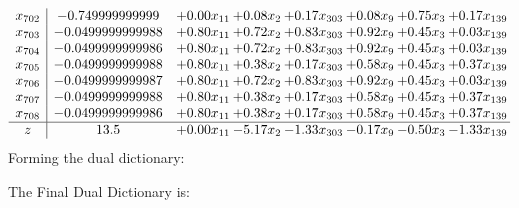 \documentclass[8pt]{article}
\begin{document}
\[\begin{array}{c| c c@{\hskip 2pt} c@{\hskip 2pt} c@{\hskip 2pt} c@{\hskip 2pt} c@{\hskip 2pt} c@{\hskip 2pt} }
 x_{702}   &  -0.749999999999 & +  0.00 x_{11} & +  0.08 x_{2} & +  0.17 x_{303} & +  0.08 x_{9} & +  0.75 x_{3} & +  0.17 x_{139}\\
 x_{703}   &  -0.0499999999988 & +  0.80 x_{11} & +  0.72 x_{2} & +  0.83 x_{303} & +  0.92 x_{9} & +  0.45 x_{3} & +  0.03 x_{139}\\
 x_{704}   &  -0.0499999999986 & +  0.80 x_{11} & +  0.72 x_{2} & +  0.83 x_{303} & +  0.92 x_{9} & +  0.45 x_{3} & +  0.03 x_{139}\\
 x_{705}   &  -0.0499999999988 & +  0.80 x_{11} & +  0.38 x_{2} & +  0.17 x_{303} & +  0.58 x_{9} & +  0.45 x_{3} & +  0.37 x_{139}\\
 x_{706}   &  -0.0499999999987 & +  0.80 x_{11} & +  0.72 x_{2} & +  0.83 x_{303} & +  0.92 x_{9} & +  0.45 x_{3} & +  0.03 x_{139}\\
 x_{707}   &  -0.0499999999988 & +  0.80 x_{11} & +  0.38 x_{2} & +  0.17 x_{303} & +  0.58 x_{9} & +  0.45 x_{3} & +  0.37 x_{139}\\
 x_{708}   &  -0.0499999999986 & +  0.80 x_{11} & +  0.38 x_{2} & +  0.17 x_{303} & +  0.58 x_{9} & +  0.45 x_{3} & +  0.37 x_{139}\\
\hline
z    &  13.5 & +  0.00 x_{11} & -5.17 x_{2} & -1.33 x_{303} & -0.17 x_{9} & -0.50 x_{3} & -1.33 x_{139}\\
\end{array}\]
Forming the dual dictionary:

The Final Dual Dictionary is: 
\end{document}
